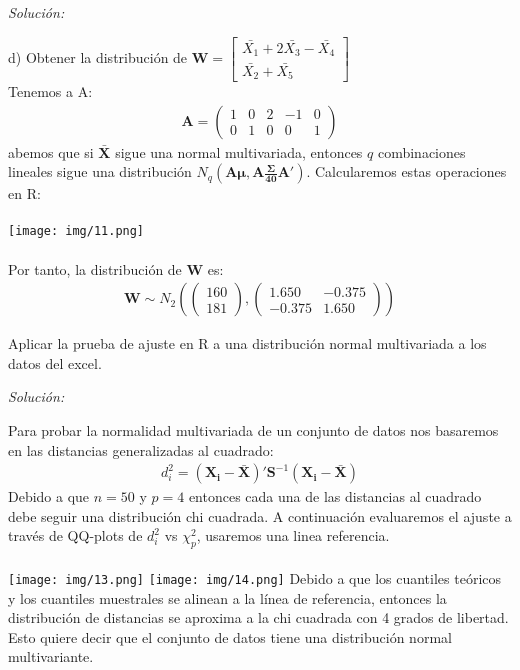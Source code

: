 \documentclass[12pt]{article}
\newenvironment{problem}[2][Problema]{\begin{trivlist}
\item[\hskip \labelsep {\bfseries #1}\hskip \labelsep {\bfseries #2.}]}{\end{trivlist}}
\newenvironment{sol}
    {\emph{Solución:}
    }
    {
    }
\begin{document}
\begin{sol}
d) Obtener la distribución de $\mathbf{W}= \begin{bmatrix}
\bar{X_1} + 2\bar{X_3}-\bar{X_4} \\
\bar{X_2}+\bar{X_5}
\end{bmatrix}$\\
Tenemos a A:
\begin{align*}\mathbf{A}=
\begin{pmatrix}
1 & 0 & 2 & -1 & 0\\
0 & 1 & 0 & 0 & 1
\end{pmatrix}
\end{align*}
abemos que si $\mathbf{\bar{X}}$ sigue una normal multivariada, entonces  $q$ combinaciones lineales sigue una distribución $N_q(\mathbf{A \mu , A \frac{\Sigma}{40} A'})$. Calcularemos estas operaciones en R:\\\\
\texttt{[image: img/11.png]}\\\\
Por tanto, la distribución de $\mathbf{W}$ es:
\begin{align*}
\mathbf{W}\sim N_2(\begin{pmatrix}
160\\181
\end{pmatrix}, 
\begin{pmatrix}
1.650 & -0.375 \\
-0.375 & 1.650
\end{pmatrix})
\end{align*}
\end{sol}

\pagebreak

\begin{problem}{3}
Aplicar la prueba de ajuste en R a una distribución normal multivariada a los datos del excel.
\end{problem}

\begin{sol}
Para probar la normalidad multivariada de un conjunto de datos nos basaremos en las distancias generalizadas al cuadrado:
\begin{align*}
d_i^2=(\mathbf{X_i-\bar{X}})'\mathbf{S}^{-1}(\mathbf{X_i-\bar{X}})
\end{align*}
Debido a que $n=50$ y $p=4$ entonces cada una de las distancias al cuadrado debe seguir una distribución chi cuadrada. A continuación evaluaremos el ajuste a través de QQ-plots de $d_i^2$ vs $\chi_p^2$, usaremos una linea referencia.
\\\\
\texttt{[image: img/13.png]}
\texttt{[image: img/14.png]}
Debido a que los cuantiles teóricos y los cuantiles muestrales se alinean a la línea de referencia, entonces la distribución de distancias se aproxima a la chi cuadrada con 4 grados de libertad. Esto quiere decir que el conjunto de datos tiene una distribución normal multivariante.
\end{sol}


\end{document}
